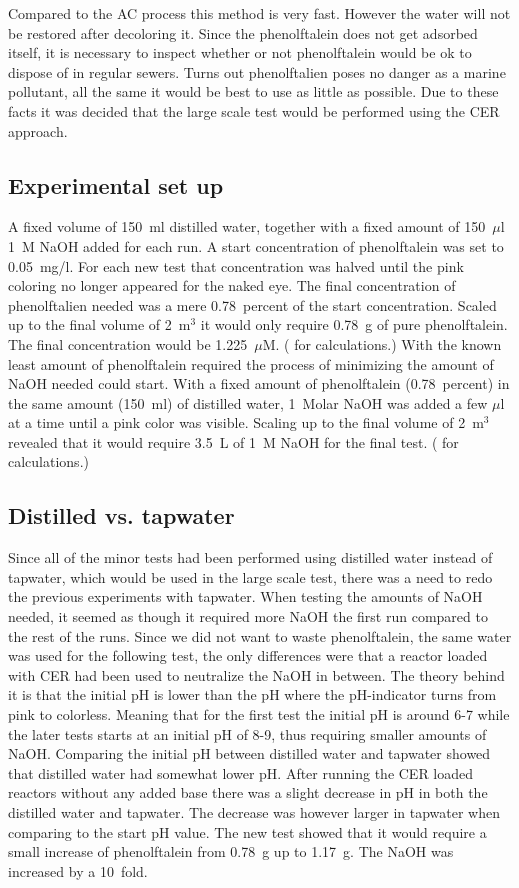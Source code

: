 Compared to the AC process this method is very fast. However the water will not
be restored after decoloring it. Since the phenolftalein does not get adsorbed
itself, it is necessary to inspect whether or not phenolftalein would be ok to
dispose of in regular sewers. Turns out phenolftalien poses no danger as a
marine pollutant, all the same it would be best to use as little as
possible.  Due to these facts it was decided that the large scale test would be
performed using the CER approach.

\subsection{Experimental set up}
A fixed volume of 150~ml distilled water, together with a fixed amount of
150~$\mu$l 1~M NaOH added for each run. A start concentration of phenolftalein
was set to 0.05~mg/l. For each new test that concentration was halved until the
pink coloring no longer appeared for the naked eye. The final concentration of
phenolftalien needed was a mere 0.78~percent of the start concentration. Scaled
up to the final volume of 2~m$^3$ it would only require 0.78~g of pure
phenolftalein. The final concentration would be 1.225~$\mu$M.
( for calculations.)
With the known least amount of phenolftalein required the process of
minimizing the amount of NaOH needed could start. With a fixed amount of
phenolftalein (0.78~percent) in the same amount (150~ml) of distilled water,
1~Molar NaOH was added a few $\mu$l at a time until a pink color was visible.
Scaling up to the final volume of 2~m$^3$ revealed that it would require 3.5~L
of 1~M NaOH for the final test. ( for calculations.)

\subsection{Distilled vs. tapwater}
Since all of the minor tests had been performed using distilled water instead
of tapwater, which would be used in the large scale test, there was a need to
redo the previous experiments with tapwater. When testing the amounts of NaOH
needed, it seemed as though it required more NaOH the first run compared to the
rest of the runs. Since we did not want to waste phenolftalein, the same water
was used for the following test, the only differences were that a reactor
loaded with CER had been used to neutralize the NaOH in between. The theory
behind it is that the initial pH is lower than the pH where the pH-indicator
turns from pink to colorless. Meaning that for the first test the initial pH is
around 6-7 while the later tests starts at an initial pH of 8-9, thus requiring
smaller amounts of NaOH.  Comparing the initial pH between distilled water and
tapwater showed that distilled water had somewhat lower pH. After running the
CER loaded reactors without any added base there was a slight decrease in pH in
both the distilled water and tapwater. The decrease was however larger in
tapwater when comparing to the start pH value.  The new test showed that it
would require a small increase of phenolftalein from 0.78~g up to 1.17~g. The
NaOH was increased by a 10~fold.

